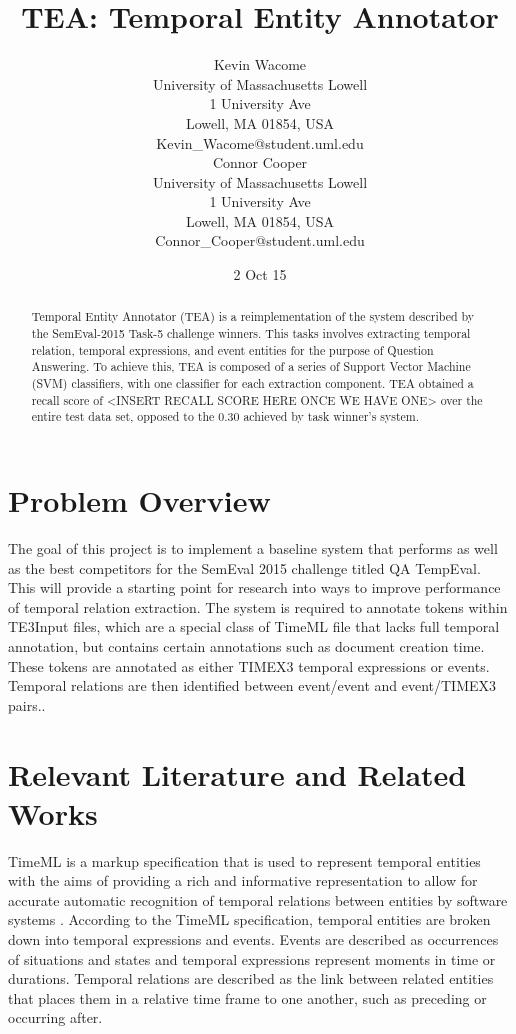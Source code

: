 \documentclass[11pt,letterpaper]{article}
\title{TEA: Temporal Entity Annotator}
\author{Kevin Wacome\\
	    University of Massachusetts Lowell\\
	    1 University Ave\\
	    Lowell, MA 01854, USA\\
	    Kevin\_Wacome@student.uml.edu\\
	  \And
		Connor Cooper\\
	  	University of Massachusetts Lowell\\
	  	1 University Ave\\
	  	Lowell, MA 01854, USA\\
		Connor\_Cooper@student.uml.edu\\}
\date{2 Oct 15}
\begin{document}
\maketitle
\begin{abstract}
Temporal Entity Annotator (TEA) is a reimplementation of the system described by the SemEval-2015 Task-5 challenge winners. This tasks involves extracting temporal relation, temporal expressions, and event entities for the purpose of Question Answering. To achieve this, TEA is composed of a series of Support Vector Machine (SVM) classifiers, with one classifier for each extraction component. TEA obtained a recall score of <INSERT RECALL SCORE HERE ONCE WE HAVE ONE> over the entire test data set, opposed to the 0.30 achieved by task winner's system.
\end{abstract}

\section{Problem Overview}

The goal of this project is to implement a baseline system that performs as well as the best competitors for the SemEval 2015 challenge titled QA TempEval. This will provide a starting point for research into ways to improve performance of temporal relation extraction. The system is required to annotate tokens within TE3Input files, which are a special class of TimeML file that lacks full temporal annotation, but contains certain annotations such as document creation time. These tokens are annotated as either TIMEX3 temporal expressions or events. Temporal relations are then identified between event/event and event/TIMEX3 pairs.\cite{Llorens:15}.


\section{Relevant Literature and Related Works}

TimeML is a markup specification that is used to represent temporal entities with the aims of providing a rich and informative representation to allow for accurate automatic recognition of temporal relations between entities by software systems \cite{Pustejovsky:03}. According to the TimeML specification, temporal entities are broken down into temporal expressions and events. Events are described as occurrences of situations and states and temporal expressions represent moments in time or durations. Temporal relations are described as the link between related entities that places them in a relative time frame to one another, such as preceding or occurring after.
\end{document}
